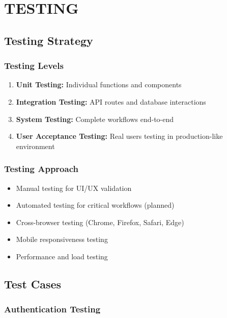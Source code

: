 \chapter{TESTING}

\section{Testing Strategy}

\subsection{Testing Levels}
\begin{enumerate}
\item \textbf{Unit Testing:} Individual functions and components
\item \textbf{Integration Testing:} API routes and database interactions
\item \textbf{System Testing:} Complete workflows end-to-end
\item \textbf{User Acceptance Testing:} Real users testing in production-like environment
\end{enumerate}

\subsection{Testing Approach}
\begin{itemize}
\item Manual testing for UI/UX validation
\item Automated testing for critical workflows (planned)
\item Cross-browser testing (Chrome, Firefox, Safari, Edge)
\item Mobile responsiveness testing
\item Performance and load testing
\end{itemize}

\section{Test Cases}

\subsection{Authentication Testing}


